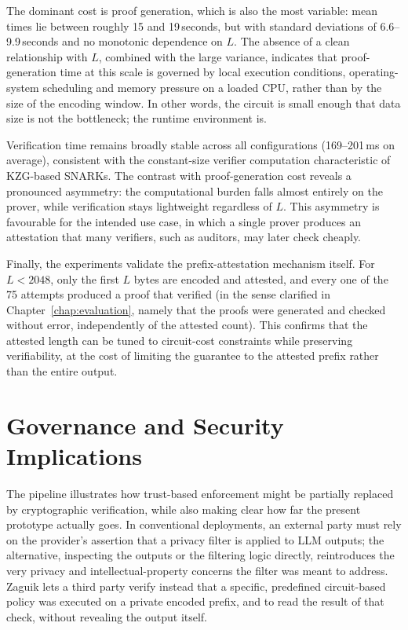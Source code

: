 The dominant cost is proof generation, which is also the most variable: mean times lie between roughly 15 and 19\,seconds, but with standard deviations of 6.6--9.9\,seconds and no monotonic dependence on $L$. The absence of a clean relationship with $L$, combined with the large variance, indicates that proof-generation time at this scale is governed by local execution conditions, operating-system scheduling and memory pressure on a loaded CPU, rather than by the size of the encoding window. In other words, the circuit is small enough that data size is not the bottleneck; the runtime environment is.

\medskip

Verification time remains broadly stable across all configurations (169--201\,ms on average), consistent with the constant-size verifier computation characteristic of KZG-based SNARKs. The contrast with proof-generation cost reveals a pronounced asymmetry: the computational burden falls almost entirely on the prover, while verification stays lightweight regardless of $L$. This asymmetry is favourable for the intended use case, in which a single prover produces an attestation that many verifiers, such as auditors, may later check cheaply.

\medskip

Finally, the experiments validate the prefix-attestation mechanism itself. For $L < 2048$, only the first $L$ bytes are encoded and attested, and every one of the 75 attempts produced a proof that verified (in the sense clarified in Chapter~\ref{chap:evaluation}, namely that the proofs were generated and checked without error, independently of the attested count). This confirms that the attested length can be tuned to circuit-cost constraints while preserving verifiability, at the cost of limiting the guarantee to the attested prefix rather than the entire output.

\section{Governance and Security Implications}
\label{sec:disc-governance}

The pipeline illustrates how trust-based enforcement might be partially replaced by cryptographic verification, while also making clear how far the present prototype actually goes. In conventional deployments, an external party must rely on the provider's assertion that a privacy filter is applied to LLM outputs; the alternative, inspecting the outputs or the filtering logic directly, reintroduces the very privacy and intellectual-property concerns the filter was meant to address. Zaguik lets a third party verify instead that a specific, predefined circuit-based policy was executed on a private encoded prefix, and to read the result of that check, without revealing the output itself.

